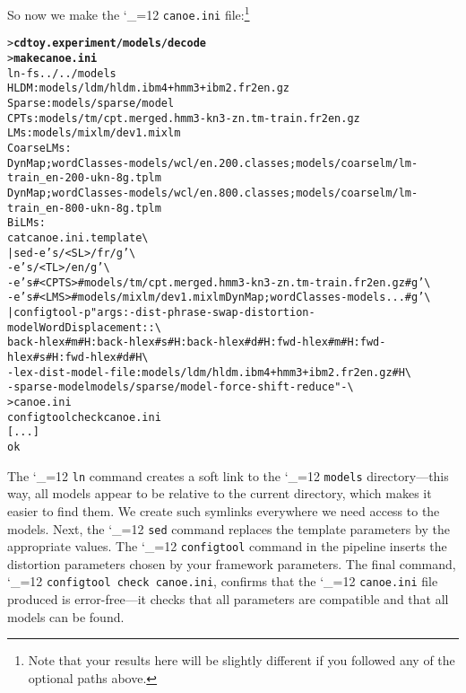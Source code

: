 \documentclass[11pt,letterpaper]{article}
\newcommand{\bs}{\textbackslash{}}
\def\code{\begingroup\catcode`\_=12 \codex}
\newcommand{\codex}[1]{\texttt{#1}\endgroup}
\begin{document}
So now we make the \code{canoe.ini} file:\footnote{Note that your results here
will be slightly different if you followed any of the optional paths above.}
\begin{small}
\begin{alltt}
   > \textbf{cd toy.experiment/models/decode}
   > \textbf{make canoe.ini}
   ln -fs ../../models
   HLDM: models/ldm/hldm.ibm4+hmm3+ibm2.fr2en.gz
   Sparse: models/sparse/model
   CPTs: models/tm/cpt.merged.hmm3-kn3-zn.tm-train.fr2en.gz
   LMs: models/mixlm/dev1.mixlm
   Coarse LMs:
      DynMap;wordClasses-models/wcl/en.200.classes;models/coarselm/lm-train_en-200-ukn-8g.tplm
      DynMap;wordClasses-models/wcl/en.800.classes;models/coarselm/lm-train_en-800-ukn-8g.tplm  
   BiLMs:
   cat canoe.ini.template \bs
      | sed -e 's/<SL>/fr/g' \bs
            -e 's/<TL>/en/g' \bs
            -e 's#<CPTS>#models/tm/cpt.merged.hmm3-kn3-zn.tm-train.fr2en.gz#g' \bs
            -e 's#<LMS>#models/mixlm/dev1.mixlm DynMap;wordClasses-models...#g' \bs
      | configtool -p "args: -dist-phrase-swap -distortion-model WordDisplacement::\bs
        back-hlex#m#H:back-hlex#s#H:back-hlex#d#H:fwd-hlex#m#H:fwd-hlex#s#H:fwd-hlex#d#H \bs
        -lex-dist-model-file :models/ldm/hldm.ibm4+hmm3+ibm2.fr2en.gz#H \bs
        -sparse-model models/sparse/model -force-shift-reduce " - \bs
      > canoe.ini
   configtool check canoe.ini
   [...]
   ok
\end{alltt}
\end{small}
The \code{ln} command creates a soft link to the \code{models} directory---this way, all
models appear to be relative to the current directory, which makes it easier to
find them.  We create such symlinks everywhere we need access to the models.
Next, the \code{sed} command replaces the template parameters by the appropriate
values.  The \code{configtool} command in the pipeline inserts the distortion
parameters chosen by your framework parameters.  The final command, \code{configtool check
canoe.ini}, confirms that the \code{canoe.ini} file produced is error-free---it
checks that all parameters are compatible and that all models can be found.
\end{document}
